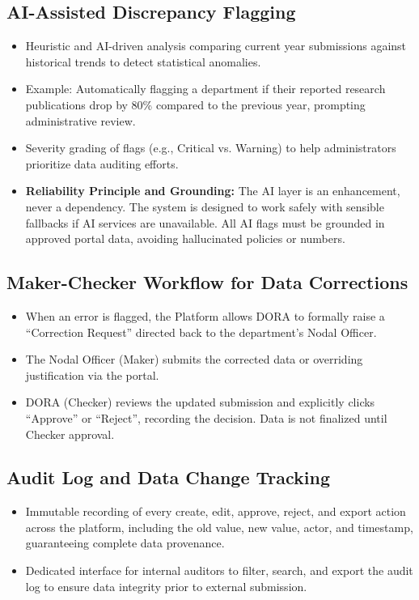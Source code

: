 \documentclass[11pt]{article}
\begin{document}
\subsection{AI-Assisted Discrepancy Flagging}
\begin{itemize}[leftmargin=1.4em, itemsep=3pt]
\item Heuristic and AI-driven analysis comparing current year submissions against historical trends to detect statistical anomalies.
\item Example: Automatically flagging a department if their reported research publications drop by 80\% compared to the previous year, prompting administrative review.
\item Severity grading of flags (e.g., Critical vs. Warning) to help administrators prioritize data auditing efforts.
\item \textbf{Reliability Principle and Grounding:} The AI layer is an enhancement, never a dependency. The system is designed to work safely with sensible fallbacks if AI services are unavailable. All AI flags must be grounded in approved portal data, avoiding hallucinated policies or numbers.
\end{itemize}

\subsection{Maker-Checker Workflow for Data Corrections}
\begin{itemize}[leftmargin=1.4em, itemsep=3pt]
\item When an error is flagged, the Platform allows DORA to formally raise a ``Correction Request'' directed back to the department's Nodal Officer.
\item The Nodal Officer (Maker) submits the corrected data or overriding justification via the portal.
\item DORA (Checker) reviews the updated submission and explicitly clicks ``Approve'' or ``Reject'', recording the decision. Data is not finalized until Checker approval.
\end{itemize}

\subsection{Audit Log and Data Change Tracking}
\begin{itemize}[leftmargin=1.4em, itemsep=3pt]
\item Immutable recording of every create, edit, approve, reject, and export action across the platform, including the old value, new value, actor, and timestamp, guaranteeing complete data provenance.
\item Dedicated interface for internal auditors to filter, search, and export the audit log to ensure data integrity prior to external submission.
\end{itemize}
\end{document}

